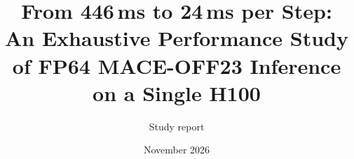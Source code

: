 \documentclass[11pt]{article}
\title{From 446\,ms to 24\,ms per Step:\\ An Exhaustive Performance Study of FP64 MACE-OFF23 Inference on a Single H100}
\author{Study report}
\date{November 2026}
\begin{document}
\maketitle

\begin{abstract}

\end{abstract}

\tableofcontents
\newpage





















\appendix

\end{document}
